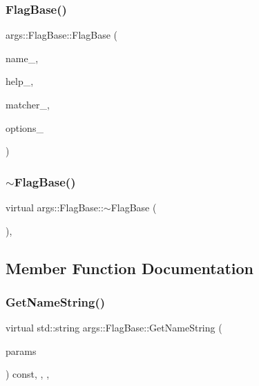 \subsubsection{\texorpdfstring{Flag\+Base()}{FlagBase()}\hspace{0.1cm}{\footnotesize\ttfamily [2/2]}}
{\footnotesize\ttfamily args\+::\+Flag\+Base\+::\+Flag\+Base (\begin{DoxyParamCaption}\item[{const std\+::string \&}]{name\+\_\+,  }\item[{const std\+::string \&}]{help\+\_\+,  }\item[{\hyperlink{classargs_1_1_matcher}{Matcher} \&\&}]{matcher\+\_\+,  }\item[{\hyperlink{namespaceargs_aa530c0f95194aa275f49a5f299ac9e77}{Options}}]{options\+\_\+ }\end{DoxyParamCaption})\hspace{0.3cm}{\ttfamily [inline]}}

\mbox{\label{classargs_1_1_flag_base_a37e287119643f8eca5eca883c3993a52}} 
\subsubsection{\texorpdfstring{$\sim$\+Flag\+Base()}{~FlagBase()}}
{\footnotesize\ttfamily virtual args\+::\+Flag\+Base\+::$\sim$\+Flag\+Base (\begin{DoxyParamCaption}{ }\end{DoxyParamCaption})\hspace{0.3cm}{\ttfamily [inline]}, {\ttfamily [virtual]}}



\subsection{Member Function Documentation}
\mbox{\label{classargs_1_1_flag_base_a61db383104c1987904bcd331d8b3be76}} 
\subsubsection{\texorpdfstring{Get\+Name\+String()}{GetNameString()}}
{\footnotesize\ttfamily virtual std\+::string args\+::\+Flag\+Base\+::\+Get\+Name\+String (\begin{DoxyParamCaption}\item[{const \hyperlink{structargs_1_1_help_params}{Help\+Params} \&}]{params }\end{DoxyParamCaption}) const\hspace{0.3cm}{\ttfamily [inline]}, {\ttfamily [override]}, {\ttfamily [protected]}, {\ttfamily [virtual]}}



